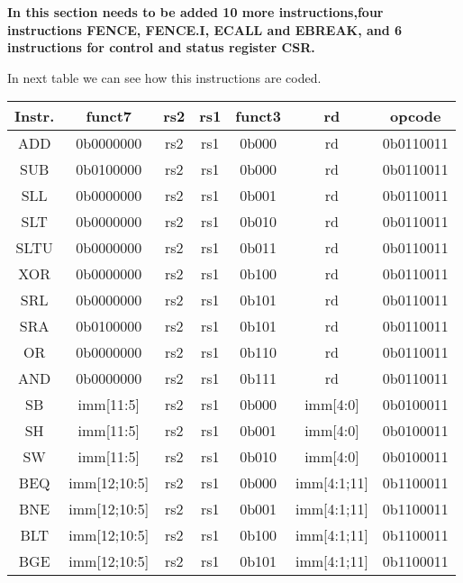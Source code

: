 \documentclass{scrreprt}
\begin{document}
    \textbf{In this section needs to be added 10 more instructions,four instructions FENCE, FENCE.I, ECALL and EBREAK, and 6 instructions for control and status register CSR.}
    
    In next table we can see how this instructions are coded.       
    \begin{table}[htb!]
        \centering
        \begin{tabular}{|c|c|c|c|c|c|c|} \hline 
             Instr. & funct7 & rs2 & rs1 & funct3 & rd & opcode\\ \hline 
             ADD & 0b0000000 & rs2 & rs1 & 0b000 & rd & 0b0110011\\ \hline 
             SUB & 0b0100000 & rs2 & rs1 & 0b000 & rd & 0b0110011\\ \hline 
             SLL & 0b0000000 & rs2 & rs1 & 0b001 & rd & 0b0110011\\ \hline 
             SLT & 0b0000000 & rs2 & rs1 & 0b010 & rd & 0b0110011\\ \hline 
             SLTU & 0b0000000 & rs2 & rs1 & 0b011 & rd & 0b0110011\\ \hline 
             XOR & 0b0000000 & rs2 & rs1 & 0b100 & rd & 0b0110011\\ \hline 
             SRL & 0b0000000 & rs2 & rs1 & 0b101 & rd & 0b0110011\\ \hline 
             SRA & 0b0100000 & rs2 & rs1 & 0b101 & rd & 0b0110011 \\ \hline 
             OR & 0b0000000 & rs2 & rs1 & 0b110 & rd & 0b0110011\\ \hline 
             AND & 0b0000000 & rs2 & rs1 & 0b111 & rd & 0b0110011\\ \hline
             SB & imm[11:5] & rs2 & rs1 & 0b000 & imm[4:0] & 0b0100011\\ \hline 
             SH & imm[11:5] & rs2 & rs1 & 0b001 & imm[4:0] & 0b0100011\\ \hline 
             SW & imm[11:5] & rs2 & rs1 & 0b010 & imm[4:0] & 0b0100011\\ \hline
             BEQ & imm[12;10:5] & rs2 & rs1 & 0b000 & imm[4:1;11] & 0b1100011\\ \hline 
             BNE & imm[12;10:5] & rs2 & rs1 & 0b001 & imm[4:1;11] & 0b1100011\\ \hline 
             BLT & imm[12;10:5] & rs2 & rs1 & 0b100 & imm[4:1;11] & 0b1100011\\ \hline
             BGE & imm[12;10:5] & rs2 & rs1 & 0b101 & imm[4:1;11] & 0b1100011\\ \hline 

\end{tabular}
\end{table}
\end{document}
